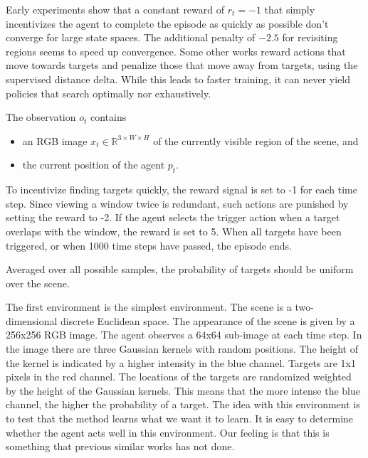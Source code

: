 Early experiments show that a constant reward of \(r_t = -1\) that simply incentivizes the agent to complete the episode as quickly as possible don't converge for large state spaces.
The additional penalty of \(-2.5\) for revisiting regions seems to speed up convergence.
Some other works reward actions that move towards targets and penalize those that move away from targets, using the supervised distance delta. %
While this leads to faster training, it can never yield policies that search optimally nor exhaustively.

The observation \(o_t\) contains

\begin{itemize}
    \item an RGB image \(x_t \in \mathbb{R}^{3 \times W \times H}\) of the currently visible region of the scene, and
    \item the current position of the agent \(p_t\). %
\end{itemize}


To incentivize finding targets quickly, the reward signal is set to -1 for each time step.
Since viewing a window twice is redundant, such actions are punished by setting the reward to -2.
If the agent selects the trigger action when a target overlaps with the window, the reward is set to 5.
When all targets have been triggered, or when 1000 time steps have passed, the episode ends.

Averaged over all possible samples, the probability of targets should be uniform over the scene.

The first environment is the simplest environment. 
The scene is a two-dimensional discrete Euclidean space.
The appearance of the scene is given by a 256x256 RGB image.
The agent observes a 64x64 sub-image at each time step.
In the image there are three Gaussian kernels with random positions.
The height of the kernel is indicated by a higher intensity in the blue channel.
Targets are 1x1 pixels in the red channel.
The locations of the targets are randomized weighted by the height of the Gaussian kernels.
This means that the more intense the blue channel, the higher the probability of a target.
The idea with this environment is to test that the method learns what we want it to learn.
It is easy to determine whether the agent acts well in this environment.
Our feeling is that this is something that previous similar works has not done. %

